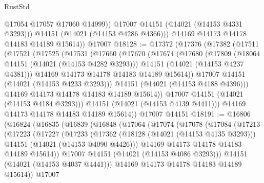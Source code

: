 \begin{lexlean}{RustStd}
\begin{coremodule}
                @17054
                @17057
                @17060
                @14999))
            @17007
            @14151
            (@14021 (@14153 @4331 @3293)))
          @14151
          (@14021 (@14153 @4286 @4366)))
        @14169
        @14173
        @14178
        @14183
        @14189
        @15614))
    @17007
@18128 := @17372
    (@17376
      (@17382
        (@17511
          (@17521
            (@17525
              (@17531
                (@17660
                  (@17670
                    (@17674
                      (@17680
                        (@17809
                          (@18064 @14151 (@14021 (@14153 @4282 @3293)))
                          @14151
                          (@14021 (@14153 @4237 @4381)))
                        @14169
                        @14173
                        @14178
                        @14183
                        @14189
                        @15614))
                    @17007
                    @14151
                    (@14021 (@14153 @4233 @3293)))
                  @14151
                  (@14021 (@14153 @4188 @4396)))
                @14169
                @14173
                @14178
                @14183
                @14189
                @15614))
            @17007
            @14151
            (@14021 (@14153 @4184 @3293)))
          @14151
          (@14021 (@14153 @4139 @4411)))
        @14169
        @14173
        @14178
        @14183
        @14189
        @15614))
    @17007
    @14151
@18191 := @16806
    (@16824
      (@16835
        (@16839
          (@16848
            (@17064
              (@17074
                (@17078
                  (@17084
                    (@17213
                      (@17223
                        (@17227
                          (@17233
                            (@17362
                              (@18128 (@14021 (@14153 @4135 @3293)))
                              @14151
                              (@14021 (@14153 @4090 @4426)))
                            @14169
                            @14173
                            @14178
                            @14183
                            @14189
                            @15614))
                        @17007
                        @14151
                        (@14021 (@14153 @4086 @3293)))
                      @14151
                      (@14021 (@14153 @4037 @4441)))
                    @14169
                    @14173
                    @14178
                    @14183
                    @14189
                    @15614))
                @17007

\end{coremodule}
\end{lexlean}

